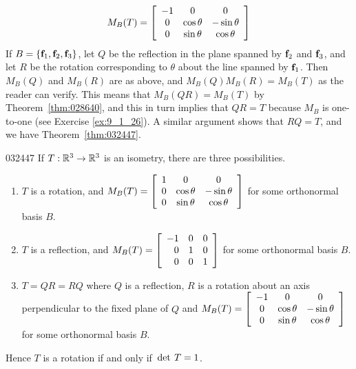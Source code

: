 \begin{equation*}
M_B(T) = 
\left[ \begin{array}{ccc}
-1 & 0 & 0 \\
0 & \cos \theta & - \sin \theta \\
0 & \sin \theta & \cos \theta
\end{array} \right]
\end{equation*}
If $B = \{\textbf{f}_{1}, \textbf{f}_{2}, \textbf{f}_{3}\}$, let $Q$ be the reflection in the plane spanned by $\textbf{f}_{2}$ and $\textbf{f}_{3}$, and let $R$ be the rotation corresponding to $\theta$ about the line spanned by $\textbf{f}_{1}$. Then $M_{B}(Q)$ and $M_{B}(R)$ are as above, and $M_{B}(Q) M_{B}(R) = M_{B}(T)$ as the reader can verify. This means that $M_{B}(QR) = M_{B}(T)$ by Theorem~\ref{thm:028640}, and this in turn implies that $QR = T$ because $M_{B}$ is one-to-one (see Exercise \ref{ex:9_1_26}). A similar argument shows that $RQ = T$, and we have Theorem~\ref{thm:032447}.

\begin{theorem}{}{032447}
If $T : \mathbb{R}^3 \to \mathbb{R}^3$ is an isometry, there are three possibilities.

\begin{enumerate}[label={\alph*.}]
\item $T$ is a rotation, and $M_B(T) = 
\left[ \begin{array}{ccc}
	1 & 0 & 0 \\
	0 & \cos \theta & - \sin \theta \\
	0 & \sin \theta & \cos \theta
\end{array} \right]$ for some orthonormal basis $B$.

\item $T$ is a reflection, and $M_B(T) =
\left[ \begin{array}{rrr}
-1 & 0 & 0 \\
0 & 1 & 0 \\
0 & 0 & 1
\end{array} \right]$ for some orthonormal basis $B$.

\item $T = QR = RQ$ where $Q$ is a reflection, $R$ is a rotation about an axis perpendicular to the fixed plane of $Q$ and $M_B(T) =
\left[ \begin{array}{ccc}
-1 & 0 & 0 \\
0 & \cos \theta & - \sin \theta \\
0 & \sin \theta & \cos \theta
\end{array} \right]$ for some orthonormal basis $B$.
\end{enumerate}

Hence $T$ is a rotation if and only if $\thinspace\operatorname{det\medspace} T = 1$.
\end{theorem}

